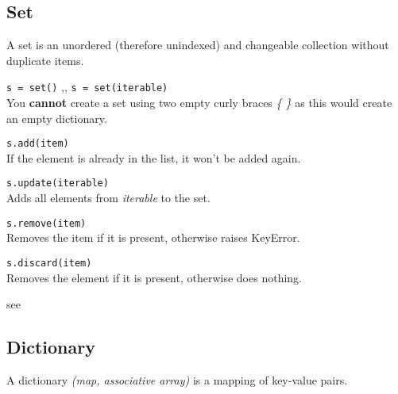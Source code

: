   \subsection{Set}
    A set is an unordered (therefore unindexed) and  changeable collection without duplicate items.

    \begin{itemize}
       \texttt{s = set()} \sep{,}
      \texttt{s = set(iterable)} \\
      You \textbf{cannot} create a set using two empty curly braces \textit{\{ \}} as this would
      create an empty dictionary.

       \texttt{s.add(item)} \\
      If the element is already in the list, it won't be added again.

       \texttt{s.update(iterable)} \\
      Adds all elements from \textit{iterable} to the set.

       \texttt{s.remove(item)} \\
      Removes the item if it is present, otherwise raises KeyError.

       \texttt{s.discard(item)} \\
      Removes the element if it is present, otherwise does nothing.

       see 
    \end{itemize}

  \subsection{Dictionary}
    A dictionary \textit{(map, associative array)} is a mapping of key-value pairs.
    
